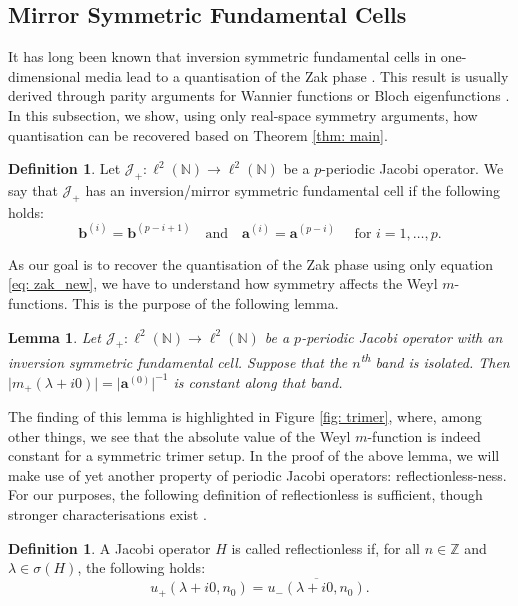 \documentclass[a4paper,reqno,twoside]{amsart}
\numberwithin{equation}{section}
\newtheorem{lemma}[theorem]{Lemma}
\theoremstyle{definition}
\newtheorem{definition}[theorem]{Definition}
\newcommand{\bseq}[2]{{\bm{#1}^{(#2)}}}
\newcommand{\<}{\ensuremath \leq}
\renewcommand{\>}{\ensuremath \geq}
\begin{document}
\subsection{Mirror Symmetric Fundamental Cells}
It has long been known that inversion symmetric fundamental cells in one-dimensional media lead to a quantisation of the Zak phase \cite{zak1989berry}. This result is usually derived through parity arguments for Wannier functions \cite{zak1989berry} or Bloch eigenfunctions \cite{coutant2024surface}. In this subsection, we show, using only real-space symmetry arguments, how quantisation can be recovered based on Theorem \ref{thm: main}. 
 
\begin{definition}
    Let $\mathcal{J_+}:\ell^2(\mathbb{N})\rightarrow\ell^2(\mathbb{N})$ be a $p$-periodic Jacobi operator. We say that $\mathcal{J_+}$ has an inversion/mirror symmetric fundamental cell if the following holds:
    \begin{equation}
        \bseq{b}{i} = \bseq{b}{p-i+1} \quad \text{and}\quad\bseq{a}{i} = \bseq{a}{p-i} \quad \text{ for } i=1, \dots, p.
    \end{equation}
\end{definition}
As our goal is to recover the quantisation of the Zak phase using only equation \eqref{eq: zak_new}, we have to understand how symmetry affects the Weyl $m$-functions. This is the purpose of the following lemma. 
\begin{lemma}\label{lem: modulus}
    Let $\mathcal{J_+}:\ell^2(\mathbb{N})\rightarrow\ell^2(\mathbb{N})$ be a $p$-periodic Jacobi operator with an inversion symmetric fundamental cell. Suppose that the $n$\textsuperscript{th} band is isolated. Then $\lvert m_+(\lambda+i0)\rvert = \lvert \bseq{a}{0}\rvert^{-1}$ is constant along that band.
\end{lemma}
The finding of this lemma is highlighted in Figure \ref{fig: trimer}, where, among other things, we see that the absolute value of the Weyl $m$-function is indeed constant for a symmetric trimer setup. In the proof of the above lemma, we will make use of yet another property of periodic Jacobi operators: reflectionless-ness. For our purposes, the following definition of reflectionless is sufficient, though stronger characterisations exist \cite{Teschl1999-dz}.
\begin{definition}
    A Jacobi operator $H$ is called reflectionless if, for all $n\in \mathbb{Z}$ and $\lambda \in \sigma(H)$, the following holds:
    \begin{equation}
        u_+(\lambda + i0,n_0) = \overline{u_-(\lambda + i0,n_0)}.
    \end{equation}
\end{definition}
\end{document}
